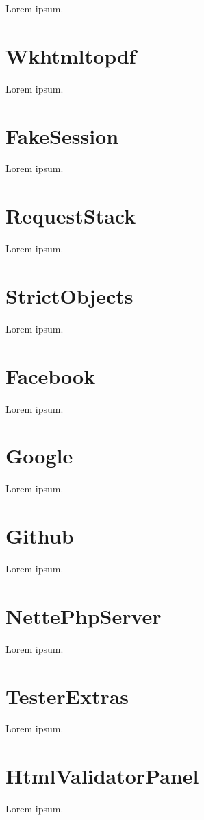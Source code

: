 Lorem ipsum.

\section{Wkhtmltopdf}

Lorem ipsum.

\section{FakeSession}

Lorem ipsum.

\section{RequestStack}

Lorem ipsum.

\section{StrictObjects}

Lorem ipsum.

\section{Facebook}

Lorem ipsum.

\section{Google}

Lorem ipsum.

\section{Github}

Lorem ipsum.

\section{NettePhpServer}

Lorem ipsum.

\section{TesterExtras}

Lorem ipsum.

\section{HtmlValidatorPanel}

Lorem ipsum.
